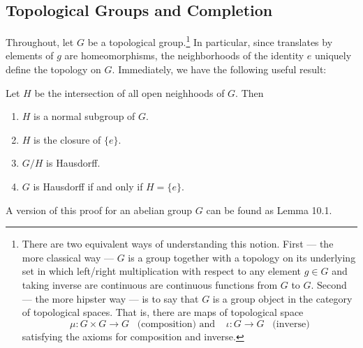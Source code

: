 \subsection{Topological Groups and Completion}

Throughout, let $G$ be a topological group.\footnote{There are two 
equivalent ways of understanding this notion. First --- the more 
classical way --- $G$ is a group together with a topology on its 
underlying set in which left/right multiplication with respect to 
any element $g \in G$ and taking inverse are continuous are 
continuous functions from $G$ to $G$.  Second --- the more hipster 
way --- is to say that $G$ is a group object in the category of 
topological spaces. That is, there are maps of topological space
\[
\mu: G \times G \to G\;\;\;\textrm{(composition) and}\;\;\;\;
\iota: G \to G\;\;\;\textrm{(inverse)}
\]
satisfying the axioms for composition and inverse.} In particular, 
since translates by elements of $g$ are homeomorphisms, the 
neighborhoods of the identity $e$ uniquely define the topology on 
$G$. Immediately, we have the following useful result:

\begin{lem}\label{lem:top_grp_neigh_props}
Let $H$ be the intersection of all open neighhoods of $G$. Then
\begin{enumerate}
\item $H$ is a normal subgroup of $G$.

\item $H$ is the closure of $\{e\}$.

\item $G/H$ is Hausdorff.

\item $G$ is Hausdorff if and only if $H = \{e\}$.
\end{enumerate}
\end{lem}

A version of this proof for an abelian group $G$ can be found as
\cite{AM} Lemma 10.1.

